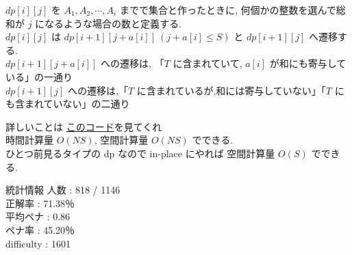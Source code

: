 \documentclass[dvipdfmx,12pt]{beamer}%
\begin{document}
\begin{frame}

$ dp[i][j] $ を $ A_1, A_2, \cdots, A_i $ までで集合と作ったときに, 何個かの整数を選んで総和が $ j $ になるような場合の数と定義する. \\
$ dp[i][j] $ は $ dp[i + 1][j + a[i]] \ (j + a[i] \leq S) $ と $ dp[i + 1][j] $ へ遷移する. \\
$ dp[i + 1][j + a[i]] $ への遷移は, 「$ T $ に含まれていて, $ a[i] $ が和にも寄与している」の一通り \\
$ dp[i + 1][j] $ への遷移は,「$ T $ に含まれているが,和には寄与していない」「$ T $ にも含まれていない」の二通り\\

\end{frame}


\begin{frame}
詳しいことは \href{https://atcoder.jp/contests/abc169/submissions/13978080}{このコード}を見てくれ \\
時間計算量 $ O(NS) $, 空間計算量 $ O(NS) $ でできる.\\

ひとつ前見るタイプの dp なので in-place にやれば 空間計算量 $ O(S) $ でできる.

\end{frame}

\begin{frame}{統計情報}
人数 : 818 / 1146 \\
正解率 : 71.38％ \\
平均ペナ : 0.86 \\
ペナ率 : 45.20％ \\ 
difficulty : 1601 \\ 

\end{frame}
\end{document}
